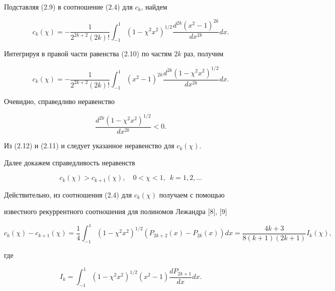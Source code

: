 Подставляя (2.9) в соотношение (2.4) для $c_k$, найдем 


\begin{equation} 


c_k(\chi)=-\frac{1}{2^{2k+2}(2k)!}\int^1_{-1} 


(1-\chi^2x^2)^{1/2}\frac{d^{2k}(x^2-1)^{2k}}{dx^{2k}}dx.\tag{2.10} 


\end{equation} 


Интегрируя в правой части равенства (2.10) по частям $2k$ раз, получим 


\begin{equation} 


c_k(\chi)=-\frac{1}{2^{2k+2}(2k)!}\int^1_{-1} 


(x^2-1)^{2k}\frac{d^{2k}(1-\chi^2x^2)^{1/2}}{dx^{2k}}dx.\tag{2.11} 


\end{equation} 


Очевидно, справедливо неравенство  


\begin{equation} 


\frac{d^{2k}(1-\chi^2x^2)^{1/2}}{dx^{2k}}<0.\tag{2.12} 


\end{equation} 


Из (2.12) и (2.11) и следует указанное неравенство для $c_k(\chi)$. 


 


Далее докажем справедливость неравенств  


\begin{equation} 


c_k(\chi)>c_{k+1}(\chi),\quad 0<\chi<1,\ \; k=1,2,\dotsc\tag{2.13} 


\end{equation} 


Действительно, из соотношения (2.4) для $c_k(\chi)$ получаем с помощью  


известного рекуррентного соотношения для полиномов Лежандра [8], [9] 


$$ 


c_k(\chi)-c_{k+1}(\chi)=\frac{1}{4}\int^1_{-1} 


(1-\chi^2x^2)^{1/2}(P_{2k+2}(x)-P_{2k}(x))dx= 


\frac{4k+3}{8(k+1)(2k+1)}I_k(\chi), 


$$ 


где 


\begin{equation} 


I_k=\int^1_{-1}(1-\chi^2x^2)^{1/2}(x^2-1) 


\frac{d P_{2k+1}}{dx}dx.\tag{2.14} 


\end{equation} 


